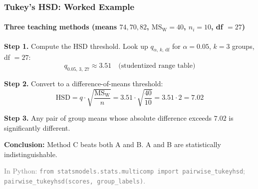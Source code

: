 \documentclass[aspectratio=169]{beamer}
\begin{document}
\begin{frame}
\frametitle{Tukey's HSD: Worked Example}
\framesubtitle{Three teaching methods (means $74, 70, 82$, $\text{MS}_\text{W} = 40$, $n_i = 10$, df $= 27$)}

\small
\textbf{Step 1.} Compute the HSD threshold. Look up $q_{\alpha,\,k,\,\text{df}}$ for $\alpha = 0.05$, $k = 3$ groups, df $= 27$:
$$q_{0.05,\,3,\,27} \approx 3.51 \quad \text{(studentized range table)}$$

\textbf{Step 2.} Convert to a difference-of-means threshold:
$$\text{HSD} = q \cdot \sqrt{\frac{\text{MS}_\text{W}}{n}} = 3.51 \cdot \sqrt{\frac{40}{10}} = 3.51 \cdot 2 = \mathbf{7.02}$$

\textbf{Step 3.} Any pair of group means whose absolute difference exceeds $7.02$ is significantly different.

\vspace{0.1cm}
\begin{center}
\end{center}

\vspace{0.1cm}
\textbf{Conclusion:} Method C beats both A and B. A and B are statistically indistinguishable.

\vspace{0.05cm}
{\scriptsize\textcolor{gray}{In Python: \texttt{from statsmodels.stats.multicomp import pairwise\_tukeyhsd}; \texttt{pairwise\_tukeyhsd(scores, group\_labels)}.}}
\end{frame}
\end{document}
